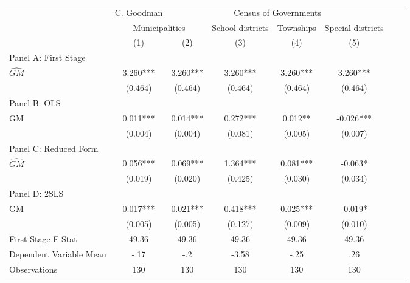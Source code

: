  \begin{tabular}{l*{7}{c}} \toprule
&\multicolumn{1}{c}{C. Goodman}&\multicolumn{4}{c}{Census of Governments}\\\cmidrule(lr){2-2}\cmidrule(lr){3-6}
&\multicolumn{2}{c}{Municipalities}&\multicolumn{1}{c}{School districts}&\multicolumn{1}{c}{Townships}&\multicolumn{1}{c}{Special districts}\\\cmidrule(lr){2-3}\cmidrule(lr){4-6}
&\multicolumn{1}{c}{(1)}&\multicolumn{1}{c}{(2)}&\multicolumn{1}{c}{(3)}&\multicolumn{1}{c}{(4)}&\multicolumn{1}{c}{(5)}\\
\cmidrule(lr){1-6}
\multicolumn{5}{l}{Panel A: First Stage}\\
\cmidrule(lr){1-6}
$\widehat{GM}$  &    3.260***&    3.260***&    3.260***&    3.260***&    3.260***\\
                &  (0.464)   &  (0.464)   &  (0.464)   &  (0.464)   &  (0.464)   \\
\cmidrule(lr){1-6}
\multicolumn{5}{l}{Panel B: OLS}\\
\cmidrule(lr){1-6}
GM              &    0.011***&    0.014***&    0.272***&    0.012** &   -0.026***\\
                &  (0.004)   &  (0.004)   &  (0.081)   &  (0.005)   &  (0.007)   \\
\cmidrule(lr){1-6}
\multicolumn{5}{l}{Panel C: Reduced Form}\\
\cmidrule(lr){1-6}
$\widehat{GM}$  &    0.056***&    0.069***&    1.364***&    0.081***&   -0.063*  \\
                &  (0.019)   &  (0.020)   &  (0.425)   &  (0.030)   &  (0.034)   \\
\cmidrule(lr){1-6}
\multicolumn{5}{l}{Panel D: 2SLS}\\
\cmidrule(lr){1-6}
GM              &    0.017***&    0.021***&    0.418***&    0.025***&   -0.019*  \\
                &  (0.005)   &  (0.005)   &  (0.127)   &  (0.009)   &  (0.010)   \\
\midrule
First Stage F-Stat&    49.36   &    49.36   &    49.36   &    49.36   &    49.36   \\
Dependent Variable Mean&     -.17   &      -.2   &    -3.58   &     -.25   &      .26   \\
Observations    &      130   &      130   &      130   &      130   &      130   \\
       \bottomrule \end{tabular}
